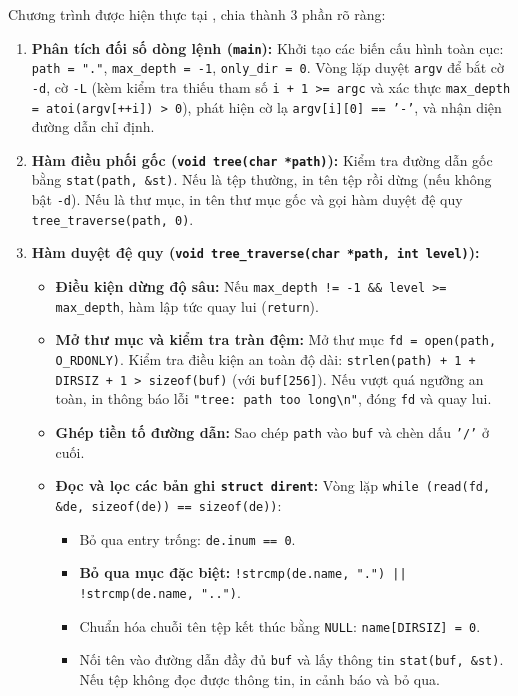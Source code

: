 \documentclass[12pt,a4paper]{article}
\begin{document}
Chương trình được hiện thực tại , chia thành 3 phần rõ ràng:
\begin{enumerate}
  \item \textbf{Phân tích đối số dòng lệnh (\texttt{main}):}
  Khởi tạo các biến cấu hình toàn cục: \texttt{path = "."}, \texttt{max\_depth = -1}, \texttt{only\_dir = 0}. Vòng lặp duyệt \texttt{argv} để bắt cờ \texttt{-d}, cờ \texttt{-L} (kèm kiểm tra thiếu tham số \texttt{i + 1 >= argc} và xác thực \texttt{max\_depth = atoi(argv[++i]) > 0}), phát hiện cờ lạ \texttt{argv[i][0] == '-'}, và nhận diện đường dẫn chỉ định.
  \item \textbf{Hàm điều phối gốc (\texttt{void tree(char *path)}):}
  Kiểm tra đường dẫn gốc bằng \texttt{stat(path, \&st)}. Nếu là tệp thường, in tên tệp rồi dừng (nếu không bật \texttt{-d}). Nếu là thư mục, in tên thư mục gốc và gọi hàm duyệt đệ quy \texttt{tree\_traverse(path, 0)}.
  \item \textbf{Hàm duyệt đệ quy (\texttt{void tree\_traverse(char *path, int level)}):}
  \begin{itemize}
    \item \textbf{Điều kiện dừng độ sâu:} Nếu \texttt{max\_depth != -1 \&\& level >= max\_depth}, hàm lập tức quay lui (\texttt{return}).
    \item \textbf{Mở thư mục và kiểm tra tràn đệm:} Mở thư mục \texttt{fd = open(path, O\_RDONLY)}. Kiểm tra điều kiện an toàn độ dài: \texttt{strlen(path) + 1 + DIRSIZ + 1 > sizeof(buf)} (với \texttt{buf[256]}). Nếu vượt quá ngưỡng an toàn, in thông báo lỗi \texttt{"tree: path too long\textbackslash n"}, đóng \texttt{fd} và quay lui.
    \item \textbf{Ghép tiền tố đường dẫn:} Sao chép \texttt{path} vào \texttt{buf} và chèn dấu \texttt{'/'} ở cuối.
    \item \textbf{Đọc và lọc các bản ghi \texttt{struct dirent}:}
    Vòng lặp \texttt{while (read(fd, \&de, sizeof(de)) == sizeof(de))}:
    \begin{itemize}
      \item Bỏ qua entry trống: \texttt{de.inum == 0}.
      \item \textbf{Bỏ qua mục đặc biệt:} \texttt{!strcmp(de.name, ".") || !strcmp(de.name, "..")}.
      \item Chuẩn hóa chuỗi tên tệp kết thúc bằng \texttt{NULL}: \texttt{name[DIRSIZ] = 0}.
      \item Nối tên vào đường dẫn đầy đủ \texttt{buf} và lấy thông tin \texttt{stat(buf, \&st)}. Nếu tệp không đọc được thông tin, in cảnh báo và bỏ qua.

\end{itemize}
\end{itemize}
\end{enumerate}
\end{document}
